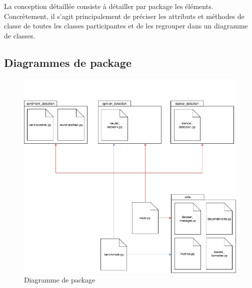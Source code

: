 \par La conception détaillée consiste à détailler par package les éléments. Concrètement, il s’agit principalement de préciser les attributs et méthodes de classe de toutes les classes participantes et de les regrouper dans un diagramme de classes.

\subsection{Diagrammes de package}
\begin{figure}[h!]
	\centerline{\includegraphics[width=\textwidth]{img/diagramme_package.png}}
	\caption{Diagramme de package}
\end{figure}
